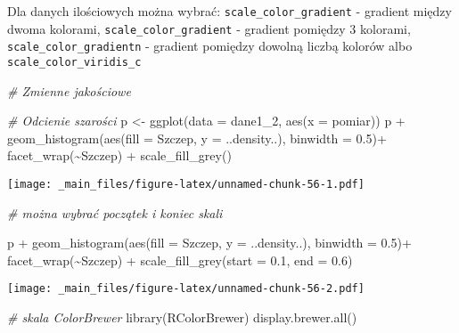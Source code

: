 \documentclass[
]{book}
\newenvironment{Shaded}{\begin{snugshade}}{\end{snugshade}}
\newcommand{\AttributeTok}[1]{\textcolor[rgb]{0.77,0.63,0.00}{#1}}
\newcommand{\CommentTok}[1]{\textcolor[rgb]{0.56,0.35,0.01}{\textit{#1}}}
\newcommand{\FloatTok}[1]{\textcolor[rgb]{0.00,0.00,0.81}{#1}}
\newcommand{\FunctionTok}[1]{\textcolor[rgb]{0.00,0.00,0.00}{#1}}
\newcommand{\NormalTok}[1]{#1}
\newcommand{\OtherTok}[1]{\textcolor[rgb]{0.56,0.35,0.01}{#1}}
\newcommand{\SpecialCharTok}[1]{\textcolor[rgb]{0.00,0.00,0.00}{#1}}
\begin{document}
Dla danych ilościowych można wybrać: \texttt{scale\_color\_gradient} - gradient między dwoma kolorami, \texttt{scale\_color\_gradient} - gradient pomiędzy 3 kolorami, \texttt{scale\_color\_gradientn} - gradient pomiędzy dowolną liczbą kolorów albo \texttt{scale\_color\_viridis\_c}

\begin{Shaded}
\begin{Highlighting}[]
\CommentTok{\# Zmienne jakościowe}

\CommentTok{\# Odcienie szarości}
\NormalTok{p }\OtherTok{\textless{}{-}} \FunctionTok{ggplot}\NormalTok{(}\AttributeTok{data =}\NormalTok{ dane1\_2, }\FunctionTok{aes}\NormalTok{(}\AttributeTok{x =}\NormalTok{ pomiar))}
\NormalTok{p }\SpecialCharTok{+} \FunctionTok{geom\_histogram}\NormalTok{(}\FunctionTok{aes}\NormalTok{(}\AttributeTok{fill =}\NormalTok{ Szczep, }\AttributeTok{y =}\NormalTok{ ..density..), }\AttributeTok{binwidth =} \FloatTok{0.5}\NormalTok{)}\SpecialCharTok{+}
  \FunctionTok{facet\_wrap}\NormalTok{(}\SpecialCharTok{\textasciitilde{}}\NormalTok{Szczep) }\SpecialCharTok{+} \FunctionTok{scale\_fill\_grey}\NormalTok{()}
\end{Highlighting}
\end{Shaded}

\texttt{[image: \_main\_files/figure-latex/unnamed-chunk-56-1.pdf]}

\begin{Shaded}
\begin{Highlighting}[]
\CommentTok{\# można wybrać początek i koniec skali}

\NormalTok{p }\SpecialCharTok{+} \FunctionTok{geom\_histogram}\NormalTok{(}\FunctionTok{aes}\NormalTok{(}\AttributeTok{fill =}\NormalTok{ Szczep, }\AttributeTok{y =}\NormalTok{ ..density..), }\AttributeTok{binwidth =} \FloatTok{0.5}\NormalTok{)}\SpecialCharTok{+}
  \FunctionTok{facet\_wrap}\NormalTok{(}\SpecialCharTok{\textasciitilde{}}\NormalTok{Szczep) }\SpecialCharTok{+} \FunctionTok{scale\_fill\_grey}\NormalTok{(}\AttributeTok{start =} \FloatTok{0.1}\NormalTok{, }\AttributeTok{end =} \FloatTok{0.6}\NormalTok{)}
\end{Highlighting}
\end{Shaded}

\texttt{[image: \_main\_files/figure-latex/unnamed-chunk-56-2.pdf]}

\begin{Shaded}
\begin{Highlighting}[]
\CommentTok{\# skala ColorBrewer}
\FunctionTok{library}\NormalTok{(RColorBrewer)}
\FunctionTok{display.brewer.all}\NormalTok{()}
\end{Highlighting}
\end{Shaded}
\end{document}
